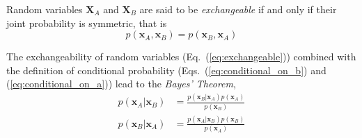 Random variables $\mathbf{X}_A$ and $\mathbf{X}_B$ are said to be \emph{exchangeable}
if and only if their joint probability is symmetric, that is
\begin{equation}
  p(\mathbf{x}_A, \mathbf{x}_B) = p(\mathbf{x}_B, \mathbf{x}_A)
\label{eq:exchangeable}
\end{equation}

The exchangeability of random variables (Eq.~(\ref{eq:exchangeable})) combined with the definition of conditional probability (Eqs.~(\ref{eq:conditional_on_b}) and (\ref{eq:conditional_on_a})) lead to the \emph{Bayes' Theorem},
\begin{equation}
  \begin{split}
    p(\mathbf{x}_A | \mathbf{x}_B) & = \frac{p(\mathbf{x}_B | \mathbf{x}_A) p(\mathbf{x}_A)}{p(\mathbf{x}_B)} \\
    p(\mathbf{x}_B | \mathbf{x}_A) & = \frac{p(\mathbf{x}_A | \mathbf{x}_B) p(\mathbf{x}_B)}{p(\mathbf{x}_A)}
  \end{split}
\label{eq:bayes_theorem}
\end{equation}